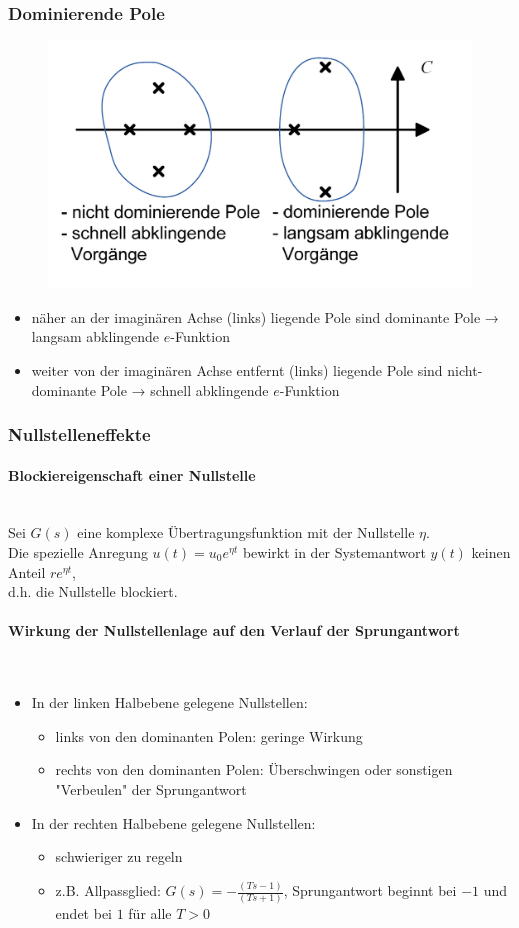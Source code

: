 \documentclass[10pt,a4paper]{article}
\begin{document}
\subsubsection{Dominierende Pole}
\begin{figure}[H]
	\includegraphics[width = 0.5\columnwidth]{imgs/pole_dominanz.png}
\end{figure}
\begin{itemize}
	\item näher an der imaginären Achse (links) liegende Pole sind dominante Pole → langsam abklingende $e$-Funktion
	\item weiter von der imaginären Achse entfernt (links) liegende Pole sind nicht-dominante Pole → schnell abklingende $e$-Funktion
\end{itemize}

\subsubsection{Nullstelleneffekte}
\paragraph{Blockiereigenschaft einer Nullstelle} ~\\
Sei $G(s)$ eine komplexe Übertragungsfunktion mit der Nullstelle $\eta$. \\
Die spezielle Anregung $u(t) = u_0 e^{\eta t}$ bewirkt in der Systemantwort $y(t)$ keinen Anteil $re^{\eta t}$, \\
d.h. die Nullstelle blockiert.

\paragraph{Wirkung der Nullstellenlage auf den Verlauf der Sprungantwort} ~\\
\begin{itemize}
	\item In der linken Halbebene gelegene Nullstellen:
	\begin{itemize}
		\item links von den dominanten Polen: geringe Wirkung
		\item rechts von den dominanten Polen: Überschwingen oder sonstigen "Verbeulen" der Sprungantwort
	\end{itemize}
	\item In der rechten Halbebene gelegene Nullstellen:
	\begin{itemize}
		\item schwieriger zu regeln
		\item z.B. Allpassglied: $G(s) = - \frac{(Ts - 1)}{(Ts + 1)}$, Sprungantwort beginnt bei $-1$ und endet bei $1$ für alle $T > 0$
	\end{itemize}
\end{itemize}
\end{document}
